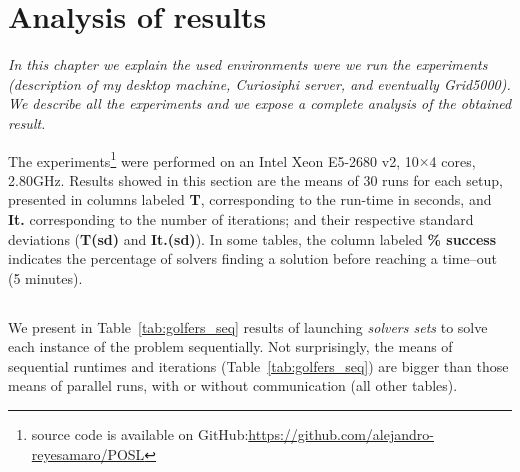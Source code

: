 \chapter{Analysis of results}
\label{chap:res}
\textit{In this chapter we explain the used environments were we run the experiments (description of my desktop machine, \textit{Curiosiphi} server, and eventually \textit{Grid5000}). We describe all the experiments and we expose a complete analysis of the obtained result.}
\vfill
\minitoc
\newpage

The experiments\footnote{\posl{} source code is available on GitHub:\href{https://github.com/alejandro-reyesamaro/POSL}{https://github.com/alejandro-reyesamaro/POSL}} 
were performed on an Intel\R{} Xeon\TM{} E5-2680 v2, 10$\times$4 cores, 2.80GHz. Results showed in this section are the means of 30 runs for each setup, presented in columns labeled {\bf T}, corresponding to the run-time in seconds, and {\bf It.} corresponding to the number of iterations; and their respective standard deviations ({\bf T(sd)} and {\bf It.(sd)}). In some tables, the column labeled \textbf{\% success} indicates the percentage of solvers finding a solution before reaching a time--out (5 minutes).


\section{\sgp}

We present in Table~\ref{tab:golfers_seq} results of launching \textit{solvers sets} to solve each instance of the problem sequentially. Not surprisingly, the means of sequential runtimes and iterations (Table~\ref{tab:golfers_seq}) are bigger than those means of parallel runs, with or without communication (all
other tables). 


